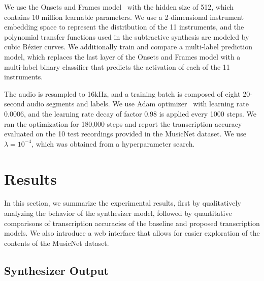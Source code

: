 We use the Onsets and Frames model~\cite{hawthorne2018onsetsframes} with the hidden size of 512, which contains 10 million learnable parameters.
We use a 2-dimensional instrument embedding space to represent the distribution of the 11 instruments, and the polynomial transfer functions used in the subtractive synthesis are modeled by cubic B\'{e}zier curves.
We additionally train and compare a multi-label prediction model, which replaces the last layer of the Onsets and Frames model with a multi-label binary classifier that predicts the activation of each of the 11 instruments.

The audio is resampled to 16kHz, and a training batch is composed of eight 20-second audio segments and labels.
We use Adam optimizer~\cite{kingma2015adam} with learning rate 0.0006, and the learning rate decay of factor 0.98 is applied every 1000 steps.
We ran the optimization for 180,000 steps and report the transcription accuracy evaluated on the 10 test recordings provided in the MusicNet dataset.
We use $\lambda = 10^{-4}$, which was obtained from a hyperparameter search.

\section{Results}

In this section, we summarize the experimental results, first by qualitatively analyzing the behavior of the synthesizer model, followed by quantitative comparisons of transcription accuracies of the baseline and proposed transcription models.
We also introduce a web interface that allows for easier exploration of the contents of the MusicNet dataset.

\subsection{Synthesizer Output}

